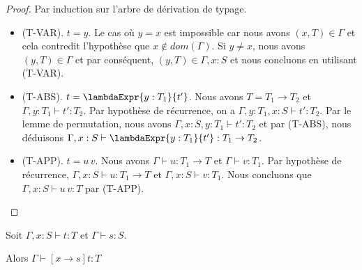 \begin{proof}
  \label{proof:simply-typed-lambda-calculus-weakening}
  Par induction sur l'arbre de dérivation de typage.
  \begin{itemize}
  \item (T-VAR). $t = y$. Le cas où $y = x$ est impossible car nous avons $(x, T)
    \in \Gamma$ et cela contredit l'hypothèse que $x \notin dom(\Gamma)$. Si $y \neq
    x$, nous avons $(y, T) \in \Gamma$ et par conséquent, $(y, T) \in \Gamma, x : S$ et nous
    concluons en utilisant (T-VAR).
  \item (T-ABS). $t = \lambdaExpr{y : T_{1}}{t'}$. Nous avons $T = T_{1}
    \rightarrow T_{2}$ et $\Gamma, y : T_{1} \vdash t' : T_{2}$. Par hypothèse de
    récurrence, on a $\Gamma, y :
    T_{1}, x : S \vdash t' : T_{2}$. Par le lemme de permutation, nous avons
    $\Gamma, x : S, y : T_{1} \vdash t' : T_{2}$ et par (T-ABS), nous déduisons
    $\Gamma, x : S \vdash \lambdaExpr{y : T_{1}}{t'} : T_{1} \rightarrow T_{2}$.
    \item (T-APP). $t = u \, v$. Nous avons $\Gamma \vdash u : T_{1} \rightarrow
      T$ et $\Gamma \vdash v : T_{1}$. Par hypothèse de récurrence, $\Gamma, x : S
      \vdash u : T_{1} \rightarrow T$ et $\Gamma, x : S \vdash v : T_{1}$. Nous
      concluons que $\Gamma, x : S \vdash u \, v : T$ par (T-APP).
  \end{itemize}
\end{proof}

\begin{lemma} 
  \label{thm:simply-typed-lambda-calculus-preservation-substitution}
  Soit $\Gamma, x : S \vdash t : T$ et $\Gamma \vdash s : S$.

  Alors $\Gamma \vdash [x \rightarrow s] t : T$
\end{lemma}

